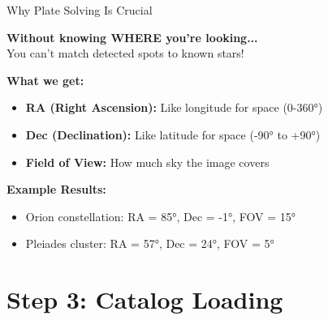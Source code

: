 \documentclass[aspectratio=169]{beamer}
\begin{document}
\begin{frame}{Why Plate Solving Is Crucial}
\begin{center}
\textbf{Without knowing WHERE you're looking...}
\\[0.5cm]
You can't match detected spots to known stars!
\end{center}

\vspace{0.5cm}
\textbf{What we get:}
\begin{itemize}
\item \textbf{RA (Right Ascension):} Like longitude for space (0-360°)
\item \textbf{Dec (Declination):} Like latitude for space (-90° to +90°)  
\item \textbf{Field of View:} How much sky the image covers
\end{itemize}

\vspace{0.5cm}
\textbf{Example Results:}
\begin{itemize}
\item Orion constellation: RA = 85°, Dec = -1°, FOV = 15°
\item Pleiades cluster: RA = 57°, Dec = 24°, FOV = 5°
\end{itemize}
\end{frame}

\section{Step 3: Catalog Loading}
\end{document}
